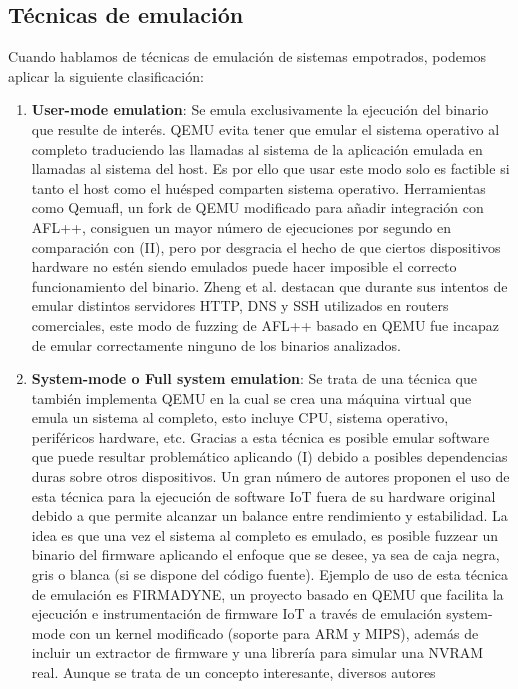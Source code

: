 \subsection{Técnicas de emulación}
Cuando hablamos de técnicas de emulación de sistemas empotrados, podemos aplicar la siguiente clasificación:
\begin{enumerate}[I]
    \item \textbf{User-mode emulation}: Se emula exclusivamente la ejecución del binario que resulte de interés. QEMU evita tener que emular el sistema 
    operativo al completo traduciendo las llamadas al sistema de la aplicación emulada en llamadas al sistema del host. Es por ello que usar este modo 
    solo es factible si tanto el host como el huésped comparten sistema operativo. Herramientas como Qemuafl\cite{qemuafl}, un fork de QEMU modificado para añadir 
    integración con AFL++, consiguen un mayor número de 
    ejecuciones por segundo en comparación con (II), pero por desgracia el hecho de que ciertos dispositivos hardware no estén siendo emulados puede hacer imposible 
    el correcto funcionamiento del binario. Zheng et al.\cite{Zheng2019} destacan que durante sus intentos de emular distintos 
    servidores HTTP, DNS y SSH utilizados en routers comerciales, este modo de fuzzing de AFL++ basado en QEMU fue incapaz de emular correctamente ninguno de los binarios analizados.
    \item \textbf{System-mode o Full system emulation}: Se trata de una técnica que también implementa QEMU en la cual se crea una máquina virtual que emula un 
    sistema al completo, esto incluye CPU, sistema operativo, periféricos hardware, etc. Gracias a esta técnica es posible emular software que puede resultar 
    problemático aplicando (I) debido a posibles dependencias duras sobre otros dispositivos. Un gran número de autores proponen el uso de esta técnica 
    para la ejecución de software IoT fuera de su hardware original debido a que permite alcanzar un balance entre rendimiento y estabilidad. La idea es que 
    una vez el sistema al completo es emulado, es posible fuzzear un binario del firmware aplicando el enfoque que se desee, ya sea de caja negra, gris o 
    blanca (si se dispone del código fuente). Ejemplo de uso de esta técnica de emulación es FIRMADYNE\cite{Chen2016}, un proyecto basado en QEMU\cite{qemu}
    que facilita la ejecución e instrumentación de firmware IoT a través de emulación system-mode con un kernel modificado (soporte para ARM y MIPS), además de incluir un extractor de firmware y una librería para simular una NVRAM real. Aunque se trata de un concepto interesante, diversos autores 

\end{enumerate}
